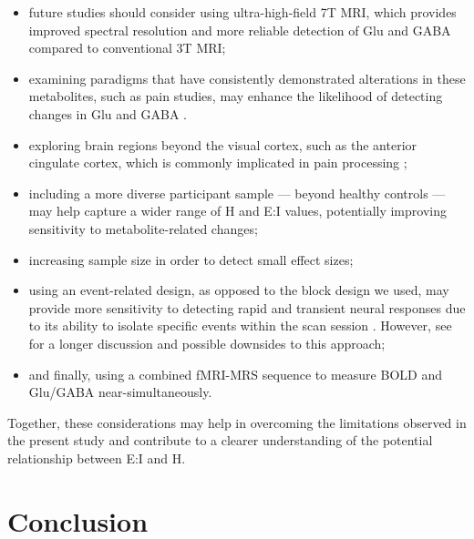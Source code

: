\documentclass[
true
]{sn-jnl}
\providecommand{\tightlist}{%
  \setlength{\itemsep}{0pt}\setlength{\parskip}{0pt}}\usepackage{longtable,booktabs,array}
\begin{document}
\begin{itemize}
\tightlist
\item
  future studies should consider using ultra-high-field 7T MRI, which
  provides improved spectral resolution and more reliable detection of
  Glu and GABA compared to conventional 3T MRI;
\item
  examining paradigms that have consistently demonstrated alterations in
  these metabolites, such as pain studies, may enhance the likelihood of
  detecting changes in Glu and GABA
  \citep{archibaldMetaboliteActivityAnterior2020, cleveAssessmentIntraInterregional2017, gutzeitDifferentialNMRSpectroscopy2013}.
\item
  exploring brain regions beyond the visual cortex, such as the anterior
  cingulate cortex, which is commonly implicated in pain processing
  \citep{archibaldMetaboliteActivityAnterior2020, mullinsNovelTechniqueStudy2005, gussewTimeresolvedFunctional1H2010, gutzeitInsulaspecificResponsesInduced2011};
\item
  including a more diverse participant sample --- beyond healthy
  controls --- may help capture a wider range of H and E:I values,
  potentially improving sensitivity to metabolite-related changes;
\item
  increasing sample size in order to detect small effect sizes;
\item
  using an event-related design, as opposed to the block design we used,
  may provide more sensitivity to detecting rapid and transient neural
  responses due to its ability to isolate specific events within the
  scan session \citep{mullinsTheoryFunctionalMagnetic2018}. However, see
  \citet{pasantaFunctionalMRSStudies2023} for a longer discussion and
  possible downsides to this approach;
\item
  and finally, using a combined fMRI-MRS sequence
  \citep{ipCombinedFMRIMRSAcquires2017, dwyerSimultaneousMeasurementBOLD2021}
  to measure BOLD and Glu/GABA near-simultaneously.
\end{itemize}

Together, these considerations may help in overcoming the limitations
observed in the present study and contribute to a clearer understanding
of the potential relationship between E:I and H.

\section{Conclusion}\label{conclusion}
\end{document}
